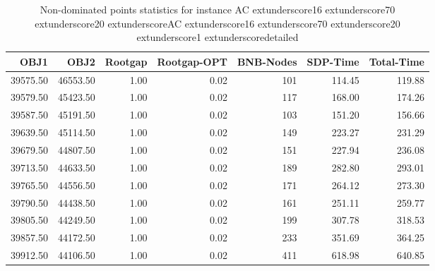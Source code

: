 \begin{table}
\caption{Non-dominated points statistics for instance AC	extunderscore16	extunderscore70	extunderscore20	extunderscoreAC	extunderscore16	extunderscore70	extunderscore20	extunderscore1	extunderscoredetailed}
\label{tab:stats/AC_16_70_20_AC_16_70_20_1_detailed}
\begin{tabular}{rrrrrrr}
\toprule
OBJ1 & OBJ2 & Rootgap & Rootgap-OPT & BNB-Nodes & SDP-Time & Total-Time \\
\midrule
39575.50 & 46553.50 & 1.00 & 0.02 & 101 & 114.45 & 119.88 \\
39579.50 & 45423.50 & 1.00 & 0.02 & 117 & 168.00 & 174.26 \\
39587.50 & 45191.50 & 1.00 & 0.02 & 103 & 151.20 & 156.66 \\
39639.50 & 45114.50 & 1.00 & 0.02 & 149 & 223.27 & 231.29 \\
39679.50 & 44807.50 & 1.00 & 0.02 & 151 & 227.94 & 236.08 \\
39713.50 & 44633.50 & 1.00 & 0.02 & 189 & 282.80 & 293.01 \\
39765.50 & 44556.50 & 1.00 & 0.02 & 171 & 264.12 & 273.30 \\
39790.50 & 44438.50 & 1.00 & 0.02 & 161 & 251.11 & 259.77 \\
39805.50 & 44249.50 & 1.00 & 0.02 & 199 & 307.78 & 318.53 \\
39857.50 & 44172.50 & 1.00 & 0.02 & 233 & 351.69 & 364.25 \\
39912.50 & 44106.50 & 1.00 & 0.02 & 411 & 618.98 & 640.85 \\
\bottomrule
\end{tabular}
\end{table}
